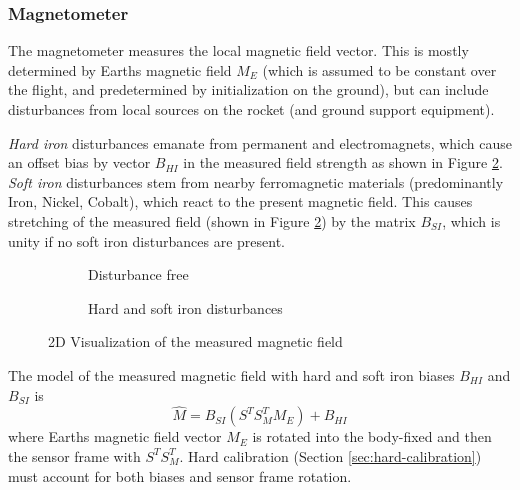 \subsubsection{Magnetometer}
The magnetometer measures the local magnetic field vector.
This is mostly determined by Earths magnetic field $M_E$ (which is assumed to be constant over the flight, and predetermined by initialization on the ground), but can include disturbances from local sources on the rocket (and ground support equipment).

\textit{Hard iron} disturbances emanate from permanent and electromagnets, which cause an offset bias by vector $B_{HI}$ in the measured field strength as shown in Figure \ref{fig:meas-mag-dist}. \\
\textit{Soft iron} disturbances stem from nearby ferromagnetic materials (predominantly Iron, Nickel, Cobalt), which react to the present magnetic field. 
This causes stretching of the measured field (shown in Figure \ref{fig:meas-mag-dist}) by the matrix $B_{SI}$, which is unity if no soft iron disturbances are present.

\begin{figure}[ht]
    \centering
    \begin{subfigure}{0.45\textwidth}
        \resizebox{0.7\textwidth}{!}{
        }
        \caption{Disturbance free}
        \label{fig:meas-mag-free}
    \end{subfigure}
    \begin{subfigure}{0.45\textwidth}
        \resizebox{0.7\textwidth}{!}{
        }
        \caption{Hard and soft iron disturbances}
        \label{fig:meas-mag-dist}
    \end{subfigure}
    \caption{2D Visualization of the measured magnetic field \cite{vectornav2024}}
    \label{fig:meas-mag}
\end{figure}

The model of the measured magnetic field with hard and soft iron biases $B_{HI}$ and $B_{SI}$ is 
\begin{equation}
    \hat M = B_{SI}(S^T S_M^T M_E) + B_{HI} \label{eq:meas-mag}
\end{equation}
where Earths magnetic field vector $M_E$ is rotated into the body-fixed and then the sensor frame with $S^T S_M^T$.
Hard calibration (Section \ref{sec:hard-calibration}) must account for both biases and sensor frame rotation.

